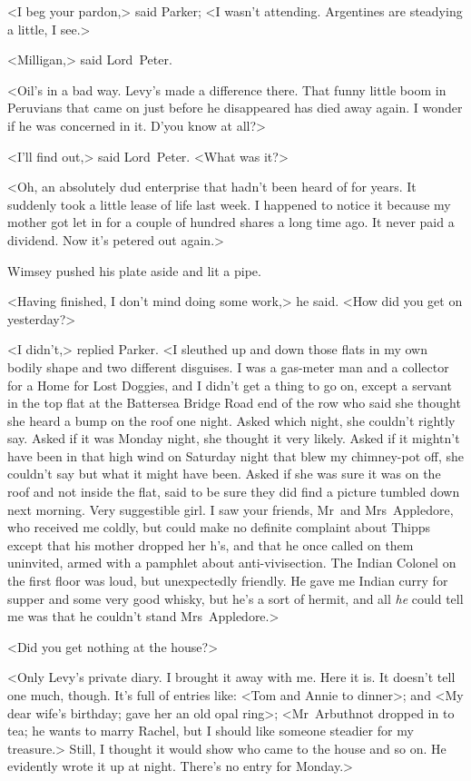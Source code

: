 <I beg your pardon,> said Parker; <I wasn't attending. Argentines are steadying a little, I see.>

<Milligan,> said Lord~Peter.

<Oil's in a bad way. Levy's made a difference there. That funny little boom in Peruvians that came on just before he disappeared has died away again. I wonder if he was concerned in it. D'you know at all?>

<I'll find out,> said Lord~Peter. <What was it?>

<Oh, an absolutely dud enterprise that hadn't been heard of for years. It suddenly took a little lease of life last week. I happened to notice it because my mother got let in for a couple of hundred shares a long time ago. It never paid a dividend. Now it's petered out again.>

Wimsey pushed his plate aside and lit a pipe.

<Having finished, I don't mind doing some work,> he said. <How did you get on yesterday?>

<I didn't,> replied Parker. <I sleuthed up and down those flats in my own bodily shape and two different disguises. I was a gas-meter man and a collector for a Home for Lost Doggies, and I didn't get a thing to go on, except a servant in the top flat at the Battersea Bridge Road end of the row who said she thought she heard a bump on the roof one night. Asked which night, she couldn't rightly say. Asked if it was Monday night, she thought it very likely. Asked if it mightn't have been in that high wind on Saturday night that blew my chimney-pot off, she couldn't say but what it might have been. Asked if she was sure it was on the roof and not inside the flat, said to be sure they did find a picture tumbled down next morning. Very suggestible girl. I saw your friends, Mr~and Mrs~Appledore, who received me coldly, but could make no definite complaint about Thipps except that his mother dropped her h's, and that he once called on them uninvited, armed with a pamphlet about anti-vivisection. The Indian Colonel on the first floor was loud, but unexpectedly friendly. He gave me Indian curry for supper and some very good whisky, but he's a sort of hermit, and all \emph{he} could tell me was that he couldn't stand Mrs~Appledore.>

<Did you get nothing at the house?>

<Only Levy's private diary. I brought it away with me. Here it is. It doesn't tell one much, though. It's full of entries like: <Tom and Annie to dinner>; and <My dear wife's birthday; gave her an old opal ring>; <Mr~Arbuthnot dropped in to tea; he wants to marry Rachel, but I should like someone steadier for my treasure.> Still, I thought it would show who came to the house and so on. He evidently wrote it up at night. There's no entry for Monday.>


